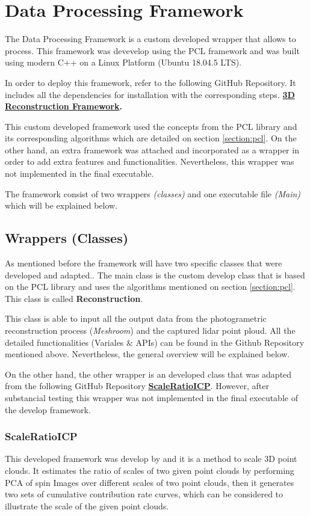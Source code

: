 \documentclass[12pt]{report}
\begin{document}
\section{Data Processing Framework}
\label{Section:data_framework}
The Data Processing Framework is a custom developed wrapper that allows to process.
This framework was devevelop using the PCL framework and was built using  modern C++ on a Linux Platform (Ubuntu 18.04.5 LTS). 

In order to deploy this framework, refer to the following GitHub Repository. It includes all the dependencies for installation with the corresponding steps. 
\textbf{\href{https://github.com/esteban-andrade/3D-Reconstructrion-Scanner} {3D Reconstruction Framework}.}

This custom developed framework used the concepts from the PCL library and its corresponding algorithms which are detailed on section \ref{section:pcl}.
On the other hand, an extra framework was attached and incorporated as a wrapper in order to add extra features and functionalities.
Nevertheless, this wrapper was not implemented in the final executable. 

The framework consist of two wrappers \textit{(classes)} and one executable file \textit{(Main)} which will be explained below.

\subsection{Wrappers (Classes)}
As mentioned before the framework will have two specific classes that were developed and adapted..
The main class is the custom develop class that is based on the PCL library and uses the algorithms mentioned on section \ref{section:pcl}. This class is called \textbf{Reconstruction}.

This class is able to input all the output data from the photogrametric reconstruction process (\textit{Meshroom}) and the captured lidar point ploud.
All the  detailed functionalities (Variales \& APIs) can be found in the Github Repository mentioned above. Nevertheless, the general overview will be explained below. 

On the other hand, the other wrapper is an developed class that was adapted from the following GitHub Repository \textbf{\href{https://github.com/linbaowei/ScaleRatioICP} {ScaleRatioICP}}.
However, after substancial testing this wrapper was not implemented in the final executable of the develop framework. 

\subsubsection{ScaleRatioICP}
This developed framework was develop by  and it is a method to scale 3D point clouds. 
It estimates the ratio of scales of two given point clouds by performing PCA of spin Images over different scales of two point clouds, then it generates two sets of cumulative contribution rate curves, which can be considered
to illustrate the scale of the given point clouds. 
\end{document}
